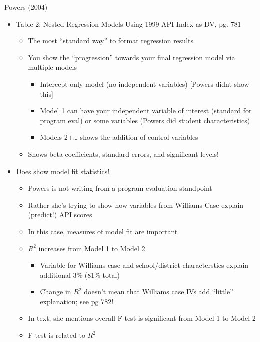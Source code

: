 \documentclass[8pt,ignorenonframetext,dvipsnames]{beamer}
\providecommand{\tightlist}{%
  \setlength{\itemsep}{0pt}\setlength{\parskip}{0pt}}
\let\olditem\item
\renewcommand{\item}{%
  \olditem\vspace{4pt}
}
\begin{document}
\begin{frame}{Powers (2004)}
\protect\hypertarget{powers-2004-1}{}

\begin{itemize}
\tightlist
\item
  Table 2: Nested Regression Models Using 1999 API Index as DV, pg. 781

  \begin{itemize}
  \tightlist
  \item
    The most ``standard way'' to format regression results
  \item
    You show the ``progression'' towards your final regression model via
    multiple models

    \begin{itemize}
    \tightlist
    \item
      Intercept-only model (no independent variables) {[}Powers didnt
      show this{]}
    \item
      Model 1 can have your independent variable of interest (standard
      for program eval) or some variables (Powers did student
      characteristics)
    \item
      Models 2+\ldots{} shows the addition of control variables
    \end{itemize}
  \item
    Shows beta coefficients, standard errors, and significant levels!
  \end{itemize}
\item
  Does show model fit statistics!

  \begin{itemize}
  \tightlist
  \item
    Powers is not writing from a program evaluation standpoint
  \item
    Rather she's trying to show how variables from Williams Case explain
    (predict!) API scores
  \item
    In this case, measures of model fit are important
  \item
    \(R^2\) increases from Model 1 to Model 2

    \begin{itemize}
    \tightlist
    \item
      Variable for Williams case and school/district characterstics
      explain additional 3\% (81\% total)
    \item
      Change in \(R^2\) doesn't mean that Williams case IVs add
      ``little'' explanation; see pg 782!
    \end{itemize}
  \item
    In text, she mentions overall F-test is significant from Model 1 to
    Model 2
  \item
    F-test is related to \(R^2\)


\end{itemize}
\end{itemize}
\end{frame}
\end{document}
